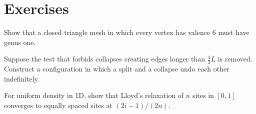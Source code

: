 \section*{Exercises}
\begin{exercise}
Show that a closed triangle mesh in which every vertex has valence 6 must have genus one.
\end{exercise}
\begin{exercise}
Suppose the test that forbids collapses creating edges longer than $\tfrac43L$ is removed. Construct
a configuration in which a split and a collapse undo each other indefinitely.
\end{exercise}
\begin{exercise}
For uniform density in 1D, show that Lloyd's relaxation of $n$ sites in $[0,1]$ converges to equally
spaced sites at $(2i-1)/(2n)$.
\end{exercise}

